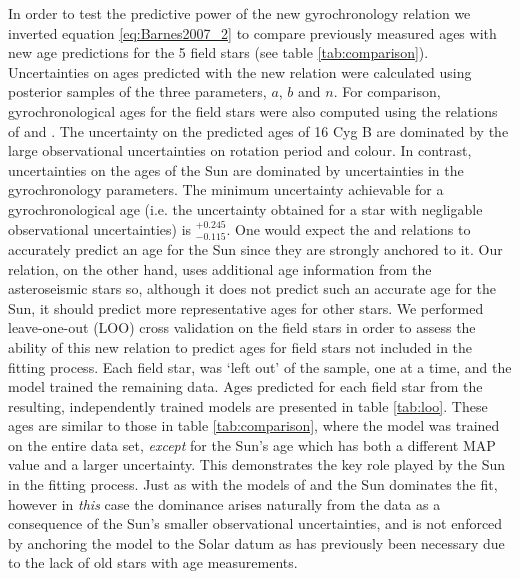 \documentclass[10pt,preprint]{aastex}
\begin{document}
In order to test the predictive power of the new gyrochronology relation we inverted equation \ref{eq:Barnes2007_2}
to compare previously measured ages with new age predictions for the 5 field stars (see table \ref{tab:comparison}).
Uncertainties on ages predicted with the new relation were calculated using posterior samples of the three parameters, $a$, $b$ and $n$.
For comparison, gyrochronological ages for the field stars were also computed using the relations of \citet{Barnes2007} and \citet{Mamajek2008}.
The uncertainty on the predicted ages of 16 Cyg B are dominated by the large observational uncertainties on rotation period and colour.
In contrast, uncertainties on the ages of the Sun are dominated by uncertainties in the gyrochronology parameters.
The minimum uncertainty achievable for a gyrochronological age (i.e. the uncertainty obtained for a star with negligable observational uncertainties) is $^{+0.245}_{-0.115}$.
One would expect the \citet{Barnes2007} and \citet{Mamajek2008} relations to accurately predict an age for the Sun since they are strongly anchored to it.
Our relation, on the other hand, uses additional age information from the asteroseismic stars so, although it does not predict such an accurate age for the Sun, it should predict more representative ages for other stars.
We performed leave-one-out (LOO) cross validation on the field stars in order to assess the ability of this new relation to predict ages for field stars not included in the fitting process.
Each field star, was `left out' of the sample, one at a time, and the model trained the remaining data.
Ages predicted for each field star from the resulting, independently trained models are presented in table \ref{tab:loo}.
These ages are similar to those in table \ref{tab:comparison}, where the model was trained on the entire data set, {\it except} for the Sun's age which has both a different MAP value and a larger uncertainty.
This demonstrates the key role played by the Sun in the fitting process.
Just as with the models of \citet{Barnes2007} and \citet{Mamajek2008} the Sun dominates the fit, however in {\it this} case the dominance arises naturally from the data as a consequence of the Sun's smaller observational uncertainties, and is not enforced by anchoring the model to the Solar datum as has previously been necessary due to the lack of old stars with age measurements.
\end{document}
